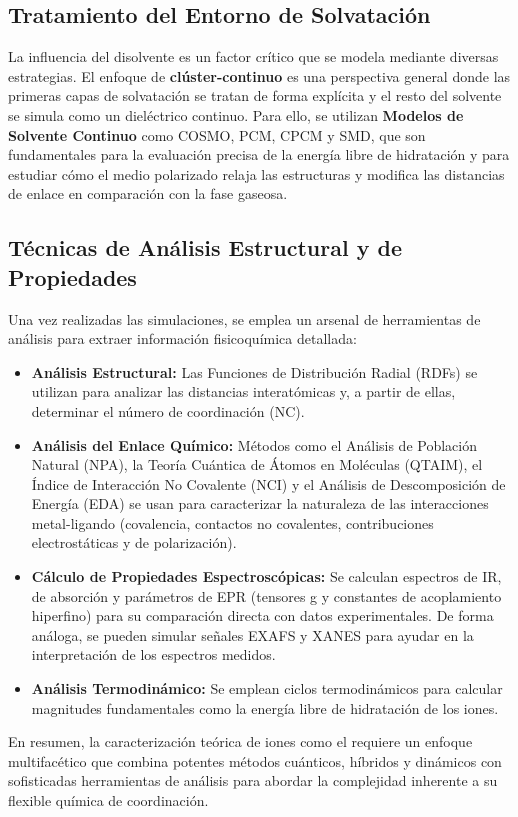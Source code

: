 \subsection{Tratamiento del Entorno de Solvatación}
La influencia del disolvente es un factor crítico que se modela mediante diversas estrategias. El enfoque de \textbf{clúster-continuo} es una perspectiva general donde las primeras capas de solvatación se tratan de forma explícita y el resto del solvente se simula como un dieléctrico continuo. Para ello, se utilizan \textbf{Modelos de Solvente Continuo} como COSMO, PCM, CPCM y SMD, que son fundamentales para la evaluación precisa de la energía libre de hidratación y para estudiar cómo el medio polarizado relaja las estructuras y modifica las distancias de enlace en comparación con la fase gaseosa.

\subsection{Técnicas de Análisis Estructural y de Propiedades}
Una vez realizadas las simulaciones, se emplea un arsenal de herramientas de análisis para extraer información fisicoquímica detallada:
\begin{itemize}
    \item \textbf{Análisis Estructural:} Las Funciones de Distribución Radial (RDFs) se utilizan para analizar las distancias interatómicas y, a partir de ellas, determinar el número de coordinación (NC).
    \item \textbf{Análisis del Enlace Químico:} Métodos como el Análisis de Población Natural (NPA), la Teoría Cuántica de Átomos en Moléculas (QTAIM), el Índice de Interacción No Covalente (NCI) y el Análisis de Descomposición de Energía (EDA) se usan para caracterizar la naturaleza de las interacciones metal-ligando (covalencia, contactos no covalentes, contribuciones electrostáticas y de polarización).
    \item \textbf{Cálculo de Propiedades Espectroscópicas:} Se calculan espectros de IR, de absorción y parámetros de EPR (tensores g y constantes de acoplamiento hiperfino) para su comparación directa con datos experimentales. De forma análoga, se pueden simular señales EXAFS y XANES para ayudar en la interpretación de los espectros medidos.
    \item \textbf{Análisis Termodinámico:} Se emplean ciclos termodinámicos para calcular magnitudes fundamentales como la energía libre de hidratación de los iones.
\end{itemize}
En resumen, la caracterización teórica de iones como el  requiere un enfoque multifacético que combina potentes métodos cuánticos, híbridos y dinámicos con sofisticadas herramientas de análisis para abordar la complejidad inherente a su flexible química de coordinación.

